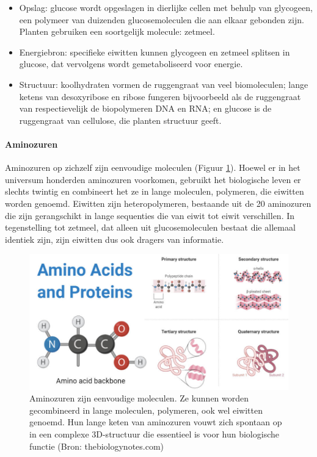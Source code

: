\documentclass[
  11pt,
]{book}
\begin{document}
\begin{itemize}
\item
  Opslag: glucose wordt opgeslagen in dierlijke cellen met behulp van glycogeen, een polymeer van duizenden glucosemoleculen die aan elkaar gebonden zijn. Planten gebruiken een soortgelijk molecule: zetmeel.
\item
  Energiebron: specifieke eiwitten kunnen glycogeen en zetmeel splitsen in glucose, dat vervolgens wordt gemetaboliseerd voor energie.
\item
  Structuur: koolhydraten vormen de ruggengraat van veel biomoleculen; lange ketens van desoxyribose en ribose fungeren bijvoorbeeld als de ruggengraat van respectievelijk de biopolymeren DNA en RNA; en glucose is de ruggengraat van cellulose, die planten structuur geeft.
\end{itemize}

\hypertarget{sectionAminoAcids}{%
\paragraph{Aminozuren}\label{sectionAminoAcids}}

Aminozuren op zichzelf zijn eenvoudige moleculen (Figuur \ref{fig:aminoAcids}).
Hoewel er in het universum honderden aminozuren voorkomen, gebruikt het biologische leven er slechts twintig en combineert het ze in lange moleculen, polymeren, die eiwitten worden genoemd. Eiwitten zijn heteropolymeren, bestaande uit de 20 aminozuren die zijn gerangschikt in lange sequenties die van eiwit tot eiwit verschillen. In tegenstelling tot zetmeel, dat alleen uit glucosemoleculen bestaat die allemaal identiek zijn, zijn eiwitten dus ook dragers van informatie.



\begin{figure}

{\centering \includegraphics[width=1\linewidth]{./figs/Amino-acids-and-Proteins} 

}

\caption{Aminozuren zijn eenvoudige moleculen. Ze kunnen worden gecombineerd in lange moleculen, polymeren, ook wel eiwitten genoemd. Hun lange keten van aminozuren vouwt zich spontaan op in een complexe 3D-structuur die essentieel is voor hun biologische functie (Bron: thebiologynotes.com)}\label{fig:aminoAcids}
\end{figure}
\end{document}
